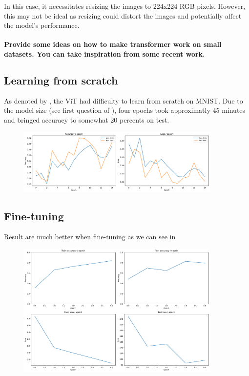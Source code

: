 In this case, it necessitates resizing the images to 224x224 RGB pixels. However, this may not be ideal as resizing could distort the images and potentially affect the model's performance.

\paragraph{Provide some ideas on how to make transformer work on small datasets. You can take inspiration from some recent work.}


\subsection{Learning from scratch}
As denoted by , the ViT had difficulty to learn from scratch on MNIST. Due to the model size (see first question of ), four epochs took approximatly 45 minutes and bringed accuracy to somewhat 20 percents on test.

\begin{figure}[H]
    \centering
    \includegraphics*[width=0.9\textwidth]{figs/Transformers/stats_vit_15.pdf}
    \caption{}
    \label{fig:stats_vit}
\end{figure}


\subsection{Fine-tuning}
Result are much better when fine-tuning as we can see in 
\begin{figure}[H]
    \centering
    \includegraphics*[width=0.9\textwidth]{figs/Transformers/stats_vit_pretrained.pdf}
    \caption{}
    \label{fig:stats_vit_pretrained}
\end{figure}

